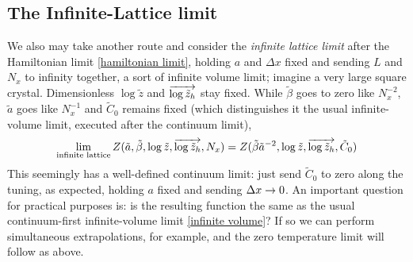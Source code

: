 \subsection{The Infinite-Lattice limit}

We also may take another route and consider the \emph{infinite lattice limit} after the Hamiltonian limit \eqref{hamiltonian limit}, holding $a$ and $\Delta x$ fixed and sending $L$ and $N_x$ to infinity together, a sort of infinite volume limit; imagine a very large square crystal.
Dimensionless $\log \tilde{z}$ and $\overrightarrow{\log \tilde{z}_h}$ stay fixed.
While $\tilde{\beta}$ goes to zero like $N_x^{-2}$, $\tilde{a}$ goes like $N_x^{-1}$ and $\tilde{C}_0$ remains fixed (which distinguishes it the usual infinite-volume limit, executed after the continuum limit),
\begin{align}
    \lim_{\text{infinite lattice}} Z(\tilde{a}, \tilde{\beta}, \log\tilde{z}, \overrightarrow{\log\tilde{z}_h}, N_x) 
    =
    Z(\tilde{\beta}\tilde{a}^{-2}, \log\tilde{z}, \overrightarrow{\log\tilde{z}_h}, \tilde{C}_0)
\end{align}
This seemingly has a well-defined continuum limit: just send $\tilde{C}_0$ to zero along the tuning, as expected, holding $a$ fixed and sending $\Delta x\rightarrow 0$.
An important question for practical purposes is: is the resulting function the same as the usual continuum-first infinite-volume limit \eqref{infinite volume}?
If so we can perform simultaneous extrapolations, for example, and the zero temperature limit will follow as above.
